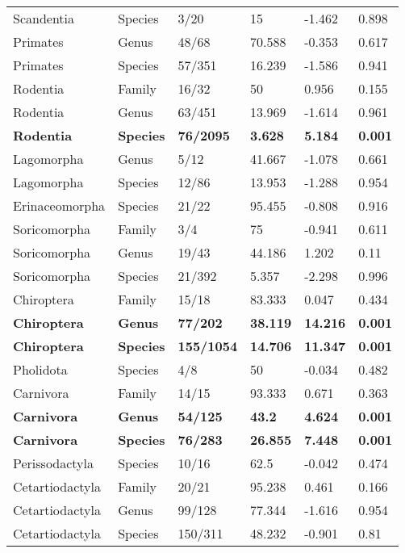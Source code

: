 \begin{longtable}{llllll}
  Scandentia & Species & 3/20 & 15 & -1.462 & 0.898 \\ 
  Primates & Genus & 48/68 & 70.588 & -0.353 & 0.617 \\ 
  Primates & Species & 57/351 & 16.239 & -1.586 & 0.941 \\ 
  Rodentia & Family & 16/32 & 50 & 0.956 & 0.155 \\ 
  Rodentia & Genus & 63/451 & 13.969 & -1.614 & 0.961 \\ 
  \textbf{Rodentia} & \textbf{Species} & \textbf{76/2095} & \textbf{3.628} & \textbf{5.184} & \textbf{0.001} \\ 
  Lagomorpha & Genus & 5/12 & 41.667 & -1.078 & 0.661 \\ 
  Lagomorpha & Species & 12/86 & 13.953 & -1.288 & 0.954 \\ 
  Erinaceomorpha & Species & 21/22 & 95.455 & -0.808 & 0.916 \\ 
  Soricomorpha & Family & 3/4 & 75 & -0.941 & 0.611 \\ 
  Soricomorpha & Genus & 19/43 & 44.186 & 1.202 & 0.11 \\ 
  Soricomorpha & Species & 21/392 & 5.357 & -2.298 & 0.996 \\ 
  Chiroptera & Family & 15/18 & 83.333 & 0.047 & 0.434 \\ 
  \textbf{Chiroptera} & \textbf{Genus} & \textbf{77/202} & \textbf{38.119} & \textbf{14.216} & \textbf{0.001} \\ 
  \textbf{Chiroptera} & \textbf{Species} & \textbf{155/1054} & \textbf{14.706} & \textbf{11.347} & \textbf{0.001} \\ 
  Pholidota & Species & 4/8 & 50 & -0.034 & 0.482 \\ 
  Carnivora & Family & 14/15 & 93.333 & 0.671 & 0.363 \\ 
  \textbf{Carnivora} & \textbf{Genus} & \textbf{54/125} & \textbf{43.2} & \textbf{4.624} & \textbf{0.001} \\ 
  \textbf{Carnivora} & \textbf{Species} & \textbf{76/283} & \textbf{26.855} & \textbf{7.448} & \textbf{0.001} \\ 
  Perissodactyla & Species & 10/16 & 62.5 & -0.042 & 0.474 \\ 
  Cetartiodactyla & Family & 20/21 & 95.238 & 0.461 & 0.166 \\ 
  Cetartiodactyla & Genus & 99/128 & 77.344 & -1.616 & 0.954 \\ 
  Cetartiodactyla & Species & 150/311 & 48.232 & -0.901 & 0.81 \\ 
   \hline
\hline
\end{longtable}
